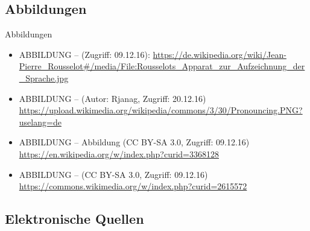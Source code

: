 \subsection*{Abbildungen}

\begin{frame}[allowframebreaks]{Abbildungen}
	\footnotesize
		
		\begin{itemize}
			\item ABBILDUNG --  (Zugriff: 09.12.16): \url{https://de.wikipedia.org/wiki/Jean-Pierre\_Rousselot\#/media/File:Rousselots\_Apparat\_zur\_Aufzeichnung\_der\_Sprache.jpg}

			\item ABBILDUNG --  (Autor: Rjanag, Zugriff: 20.12.16) \url{https://upload.wikimedia.org/wikipedia/commons/3/30/Pronouncing.PNG?uselang=de}

			\item ABBILDUNG -- Abbildung  (CC BY-SA 3.0, Zugriff: 09.12.16) \url{https://en.wikipedia.org/w/index.php?curid=3368128}

			\item ABBILDUNG --  (CC BY-SA 3.0, Zugriff: 09.12.16) \url{https://commons.wikimedia.org/w/index.php?curid=2615572}
		\end{itemize}	
	
\end{frame}


\subsection*{Elektronische Quellen}

